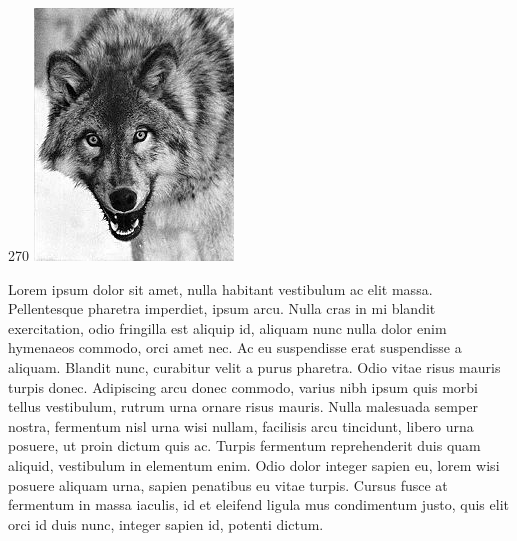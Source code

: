 \documentclass[10pt,letterpaper]{article}
\begin{document}
\begin{rotate}{270}
\includegraphics{img/canis}
\end{rotate}
\begin{center}
Lorem ipsum dolor sit amet, nulla habitant vestibulum ac elit massa. Pellentesque pharetra imperdiet, ipsum arcu. Nulla cras in mi blandit exercitation, odio fringilla est aliquip id, aliquam nunc nulla dolor enim hymenaeos commodo, orci amet nec. Ac eu suspendisse erat suspendisse a aliquam. Blandit nunc, curabitur velit a purus pharetra. Odio vitae risus mauris turpis donec. Adipiscing arcu donec commodo, varius nibh ipsum quis morbi tellus vestibulum, rutrum urna ornare risus mauris. Nulla malesuada semper nostra, fermentum nisl urna wisi nullam, facilisis arcu tincidunt, libero urna posuere, ut proin dictum quis ac. Turpis fermentum reprehenderit duis quam aliquid, vestibulum in elementum enim. Odio dolor integer sapien eu, lorem wisi posuere aliquam urna, sapien penatibus eu vitae turpis. Cursus fusce at fermentum in massa iaculis, id et eleifend ligula mus condimentum justo, quis elit orci id duis nunc, integer sapien id, potenti dictum.
\end{center}
\end{document}

